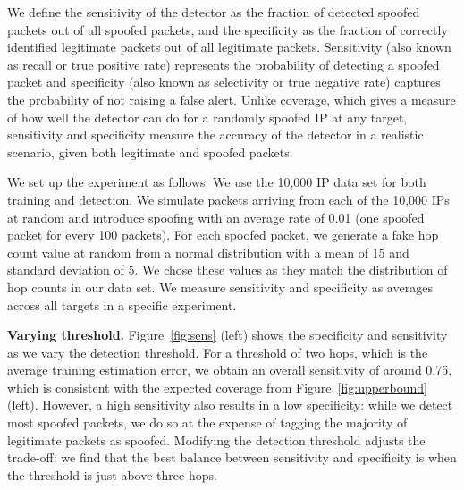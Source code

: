 We define the sensitivity of the detector as the fraction of detected spoofed packets out of all spoofed packets, and the specificity as the fraction of correctly identified legitimate packets out of all legitimate packets. Sensitivity (also known as recall or true positive rate) represents the probability of detecting a spoofed packet and specificity (also known as selectivity or true negative rate) captures the probability of not raising a false alert. Unlike coverage, which gives a measure of how well the detector can do for a randomly spoofed IP at any target, sensitivity and specificity measure the accuracy of the detector in a realistic scenario, given both legitimate and spoofed packets.

We set up the experiment as follows. We use the 10,000 IP data set for both training and detection. We simulate packets arriving from each of the 10,000 IPs at random and introduce spoofing with an average rate of 0.01 (one spoofed packet for every 100 packets). For each spoofed packet, we generate a fake hop count value at random from a normal distribution with a mean of 15 and standard deviation of 5. We chose these values as they match the distribution of hop counts in our data set. We measure sensitivity and specificity as averages across all targets in a specific experiment.




{\bf Varying threshold.} Figure~\ref{fig:sens} (left) shows the specificity and sensitivity as we vary the detection threshold. For a threshold of two hops, which is the average training estimation error, we obtain an overall sensitivity of around 0.75, which is consistent with the expected coverage from Figure~\ref{fig:upperbound} (left). However, a high sensitivity also results in a low specificity: while we detect most spoofed packets, we do so at the expense of tagging the majority of legitimate packets as spoofed. Modifying the detection threshold adjusts the trade-off: we find that the best balance between sensitivity and specificity is when the threshold is just above three hops. 

